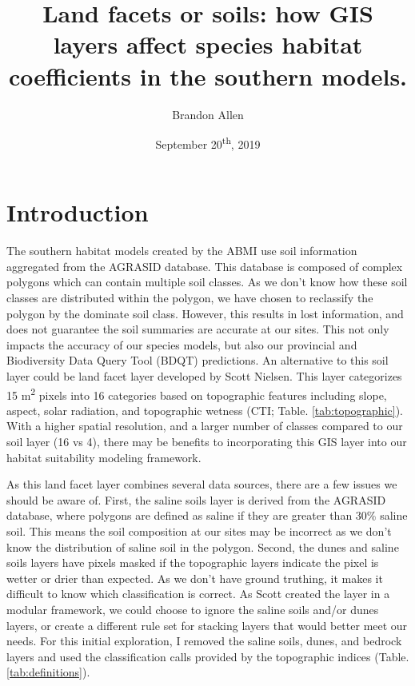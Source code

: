 \documentclass[12pt]{article}
\title{Land facets or soils: how GIS layers affect species habitat coefficients in the southern models.}
\author{Brandon Allen}
\date{September 20\textsuperscript{th}, 2019}
\begin{document}
\maketitle

\section{Introduction}

The southern habitat models created by the ABMI use soil information aggregated from the AGRASID database. This database is composed of complex polygons which can contain multiple soil classes. As we don’t know how these soil classes are distributed within the polygon, we have chosen to reclassify the polygon by the dominate soil class. However, this results in lost information, and does not guarantee the soil summaries are accurate at our sites. This not only impacts the accuracy of our species models, but also our provincial and Biodiversity Data Query Tool (BDQT) predictions. An alternative to this soil layer could be land facet layer developed by Scott Nielsen. This layer categorizes 15 m\textsuperscript{2} pixels into 16 categories based on topographic features including slope, aspect, solar radiation, and topographic wetness (CTI; Table. \ref{tab:topographic}). With a higher spatial resolution, and a larger number of classes compared to our soil layer (16 vs 4), there may be benefits to incorporating this GIS layer into our habitat suitability modeling framework.

As this land facet layer combines several data sources, there are a few issues we should be aware of. First, the saline soils layer is derived from the AGRASID database, where polygons are defined as saline if they are greater than 30\% saline soil. This means the soil composition at our sites may be incorrect as we don’t know the distribution of saline soil in the polygon. Second, the dunes and saline soils layers have pixels masked if the topographic layers indicate the pixel is wetter or drier than expected. As we don’t have ground truthing, it makes it difficult to know which classification is correct. As Scott created the layer in a modular framework, we could choose to ignore the saline soils and/or dunes layers, or create a different rule set for stacking layers that would better meet our needs. For this initial exploration, I removed the saline soils, dunes, and bedrock layers and used the classification calls provided by the topographic indices (Table. \ref{tab:definitions}).
\end{document}

